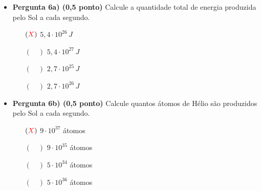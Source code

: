 \documentclass[a4paper, 12pt]{article}
\newcommand{\red}[1]{\textcolor{red}{#1}}
\begin{document}
\begin{flushleft}
\begin{itemize}
            \begin{itemize}
                \item \textbf{Pergunta 6a) (0,5 ponto)} Calcule a quantidade total de energia produzida pelo Sol a cada segundo.
                    \begin{itemize}
                        \item[$(\red{X})$] $5,4 \cdot 10^{26} \, J$
                        \item[$(\quad)$] $5,4 \cdot 10^{27} \, J$
                        \item[$(\quad)$] $2,7 \cdot 10^{25} \, J$
                        \item[$(\quad)$] $2,7 \cdot 10^{26} \, J$
                    \end{itemize}
                \item \textbf{Pergunta 6b) (0,5 ponto)} Calcule quantos átomos de Hélio são produzidos pelo Sol a cada segundo.
                    \begin{itemize}
                        \item[$(\red{X})$] $9 \cdot 10^{37}$ átomos
                        \item[$(\quad)$] $9 \cdot 10^{35}$ átomos
                        \item[$(\quad)$] $5 \cdot 10^{34}$ átomos
                        \item[$(\quad)$] $5 \cdot 10^{36}$ átomos
                    \end{itemize}
            \end{itemize}
        

\end{itemize}
\end{flushleft}
\end{document}
